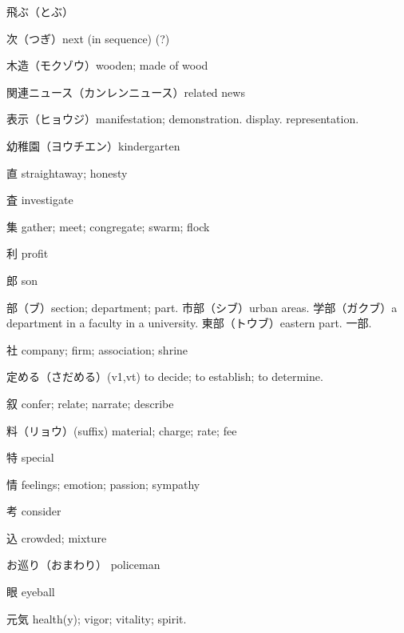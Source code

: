 飛ぶ（とぶ）

次（つぎ）next (in sequence) (?)

木造（モクゾウ）wooden; made of wood

関連ニュース（カンレンニュース）related news

表示（ヒョウジ）manifestation; demonstration. display. representation.

幼稚園（ヨウチエン）kindergarten

直 straightaway; honesty

査 investigate

集 gather; meet; congregate; swarm; flock

利 profit

郎 son

部（ブ）section; department; part.
市部（シブ）urban areas.
学部（ガクブ）a department in a faculty in a university.
東部（トウブ）eastern part.
一部.

社 company; firm; association; shrine

定める（さだめる）(v1,vt) to decide; to establish; to determine.

叙 confer; relate; narrate; describe

料（リョウ）(suffix) material; charge; rate; fee

特 special

情 feelings; emotion; passion; sympathy

考 consider

込 crowded; mixture

お巡り（おまわり）
policeman

眼 eyeball

元気 health(y); vigor; vitality; spirit.
